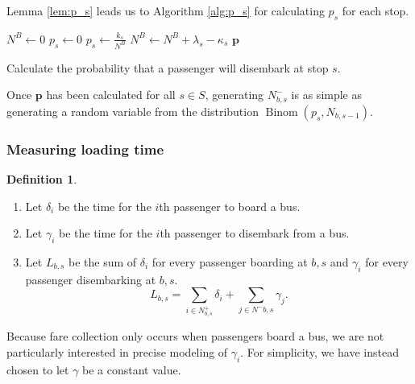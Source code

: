 \documentclass[12pt]{article}
\theoremstyle{definition}
\newtheorem{definition}{Definition}
\DeclareMathOperator{\Binom}{Binom}
\begin{document}
    Lemma \ref{lem:p_s} leads us to Algorithm \ref{alg:p_s} for calculating
    $p_s$ for each stop.

    \begin{algorithm}
        \begin{algorithmic}
            \State $N^B \gets 0$
            \State $p_s \gets 0$
            \Else
            \State $p_s \gets \frac{k_s}{N^B}$
            \EndIf
            \State $N^B \gets N^B + \lambda_s - \kappa_s$
            \EndFor
            \State \Return $\mathbf p$
            \EndFunction
        \end{algorithmic}
        \caption{Calculate the probability that a passenger will disembark at
        stop $s$.}
        \label{alg:p_s}
    \end{algorithm}

    Once $\mathbf p$ has been calculated for all $s \in S$, generating
    $N^-_{b,s}$ is as simple as generating a random variable from the
    distribution $\Binom(p_s, N_{b,s-1})$.

\subsubsection{Measuring loading time}
\label{sec:loading-time}

\begin{definition}
    \hfill
    \begin{enumerate}
        \item Let $\delta_i$ be the time for the $i$th passenger to board a
            bus.
        \item Let $\gamma_i$ be the time for the $i$th passenger to disembark
            from a bus.
        \item Let $L_{b,s}$ be the sum of $\delta_i$ for every passenger
            boarding at $b,s$ and $\gamma_i$ for every passenger disembarking
            at $b,s$.
            \[
                L_{b,s} = \sum_{i \in N^+_{b,s}} \delta_i +
                \sum_{j \in N^-{b,s}} \gamma_j.
            \]
    \end{enumerate}
\end{definition}

Because fare collection only occurs when passengers board a bus, we are not
particularly interested in precise modeling of $\gamma_i$. For simplicity, we
have instead chosen to let $\gamma$ be a constant value.
\end{document}
